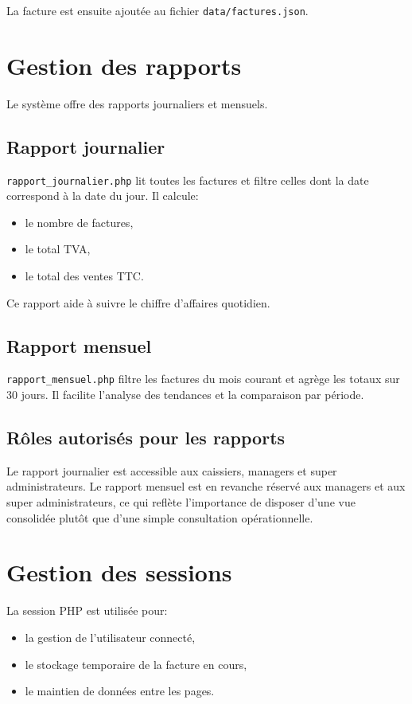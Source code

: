 \documentclass[12pt,a4paper]{article}
\begin{document}
La facture est ensuite ajoutée au fichier \texttt{data/factures.json}.

\section{Gestion des rapports}
Le système offre des rapports journaliers et mensuels.

\subsection{Rapport journalier}
\texttt{rapport\_journalier.php} lit toutes les factures et filtre celles dont la date correspond à la date du jour. Il calcule:
\begin{itemize}
  \item le nombre de factures,
  \item le total TVA,
  \item le total des ventes TTC.
\end{itemize}

Ce rapport aide à suivre le chiffre d'affaires quotidien.

\subsection{Rapport mensuel}
\texttt{rapport\_mensuel.php} filtre les factures du mois courant et agrège les totaux sur 30 jours. Il facilite l'analyse des tendances et la comparaison par période.

\subsection{Rôles autorisés pour les rapports}
Le rapport journalier est accessible aux caissiers, managers et super administrateurs. Le rapport mensuel est en revanche réservé aux managers et aux super administrateurs, ce qui reflète l'importance de disposer d'une vue consolidée plutôt que d'une simple consultation opérationnelle.

\newpage

\section{Gestion des sessions}
La session PHP est utilisée pour:
\begin{itemize}
  \item la gestion de l'utilisateur connecté,
  \item le stockage temporaire de la facture en cours,
  \item le maintien de données entre les pages.
\end{itemize}
\end{document}
